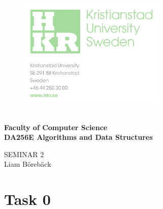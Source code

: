 \documentclass{article}
\begin{document}
	

	\begin{figure}[h!]

			\includegraphics[width=7cm]{images/hkr.png}
			\label{title}
	   \endminipage
		\endminipage
	\end{figure}
	
	\vspace{0.8cm}
	\Large

	\textbf{\\ Faculty of Computer Science\\ DA256E Algorithms and Data Structures}
	\begin{center}
	\vspace{4cm}
	\Huge
	SEMINAR 2\\
	\vspace{2cm}
	\LARGE
	Liam Börebäck
	\end{center}
	
\thispagestyle{empty}       %

\newpage
	
\tableofcontents
\large
\thispagestyle{empty}        %

\newpage
\listoffigures
\listoftables

\newpage

\newpage 

\section{Task 0}
\end{document}
